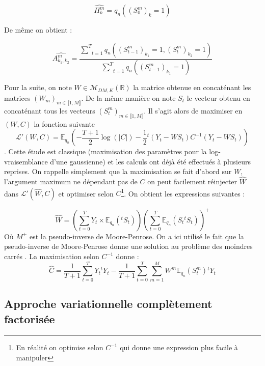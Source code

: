 \documentclass[10pt,a4paper]{article}
\begin{document}
\begin{equation}
  \widehat{\Pi_k^m}=q_{n}((S_0^m)_k=1)
\end{equation}

De même on obtient :

\begin{equation}
  \widehat{A_{k_1,k_2}^m}=\frac{\underset{t=1}{\overset{T}{\sum}}q_n((S_{t-1}^m)_{
  k_1}=1,(S_t^m)_{k_2}=1)}{\underset{t=1}{\overset{T}{\sum}}q_n((S_{t-1}^m)_{k_1}
  =1)}
\end{equation}

  Pour la suite, on note $W \in \mathcal{M}_{DM,K}(\mathbb{R})$ la matrice 
obtenue en concaténant les matrices $(W_m)_{m \in \llbracket 1,M \rrbracket}$. 
De la même manière on note $S_t$ le vecteur obtenu en concaténant tous les 
vecteurs $(S_t^m)_{m \in \llbracket 1,M \rrbracket}$.
Il s'agit alors de maximiser en $(W,C)$ la fonction suivante 
\[ \mathcal{L}'(W,C)=\mathbb{E}_{q_n}\left(-\frac{T+1}{2} \log(\vert C \vert) 
-\frac{1}{2} {}^t\left(Y_t-WS_t \right)C^{-1} \left( Y_t-WS_t\right)\right) \].
Cette étude est classique (maximisation des paramètres pour la 
log-vraisemblance d'une gaussienne) et les calculs ont déjà été effectués à 
plusieurs reprises.
On rappelle simplement que la maximisation se fait d'abord sur $W$, l'argument
maximum ne dépendant pas de $C$ on peut facilement réinjecter
$\widehat{W}$ dans $\mathcal{L}'(\widehat{W},C)$ et optimiser selon
$C$\footnote{En réalité on optimise selon $C^{-1}$ qui donne une 
expression plus facile à manipuler}.
On obtient les expressions suivantes :

\begin{equation}
  \widehat{W}=\left( \underset{t=0}{\overset{T}{\sum}} Y_t \times 
  \mathbb{E}_{q_n}({}^tS_t) \right) \left( \underset{t=0}{\overset{T}{\sum}} 
  \mathbb{E}_{q_n}\left( S_t {}^t S_t\right)\right)^+
\end{equation}
Où $M^+$ est la pseudo-inverse de Moore-Penrose. On a ici utilisé le fait que 
la pseudo-inverse de Moore-Penrose donne une solution au problème des moindres 
carrés \cite{ben2003generalized}. La maximisation selon $C^{-1}$ donne :
\begin{equation}
\widehat{C}=\frac{1}{T+1}\underset{t=0}{\overset{T}{\sum}}Y_t 
{}^tY_t-\frac{1}{T+1}\underset{t=0}{\overset{T}{\sum}}\underset{m=1}{\overset{M}
{\sum}}W^m\mathbb{E}_{q_n}(S_t^m){}^t Y_t
\end{equation}

\subsection{Approche variationnelle complètement factorisée}
\end{document}
